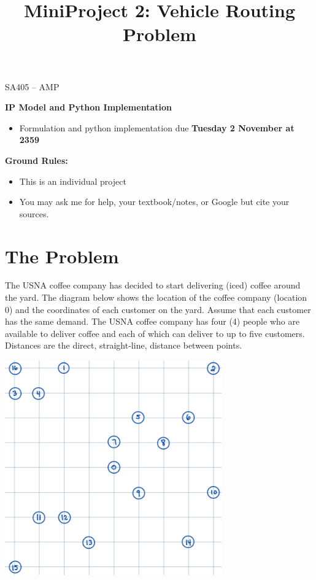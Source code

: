 \documentclass[11pt]{article}
\makeatletter
\newcommand{\blu}{\color{blue}}
\theoremstyle{definition}
\renewcommand{\maketitle}{
  \noindent SA405 -- AMP \hfill \\

  \begin{center}\Large{\textbf{\@title}}\end{center}
}
\makeatother
\begin{document}
  
\title{MiniProject 2:  Vehicle Routing Problem}

\maketitle

{\blu \Large \textbf{IP Model and Python Implementation}}
	\begin{itemize}
	\item Formulation and python implementation due \textbf{Tuesday 2 November at 2359}
	\end{itemize}

{\blu \Large \bf Ground Rules:}
	\begin{itemize}
	\item This is an individual project
	\item You may ask me for help, your textbook/notes, or Google but cite your sources.
	\end{itemize}

\section{The Problem}

The USNA coffee company has decided to start delivering (iced) coffee around the yard. The diagram below shows the location of the coffee company (location 0) and the coordinates of each customer on the yard. Assume that each customer has the same demand. The USNA coffee company has four (4) people who are available to deliver coffee and each of which can deliver to up to five customers.  Distances are the direct, straight-line, distance between points.

\begin{center}
\includegraphics[width=0.7\textwidth]{map.png}
\end{center}
\end{document}
